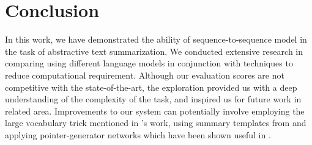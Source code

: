 \section{Conclusion}
\label{sec: conclusion}

In this work, we have demonstrated the ability of sequence-to-sequence model in the task of abstractive text summarization. We conducted extensive research in comparing using different language models in conjunction with techniques to reduce computational requirement. Although our evaluation scores are not competitive with the state-of-the-art, the exploration provided us with a deep understanding of the complexity of the task, and inspired us for future work in related area. Improvements to our system can potentially involve employing the large vocabulary trick mentioned in \cite{jean2014using}'s work, using summary templates from \cite{cao2018retrieve} and applying pointer-generator networks which have been shown useful in \cite{see2017get}. 